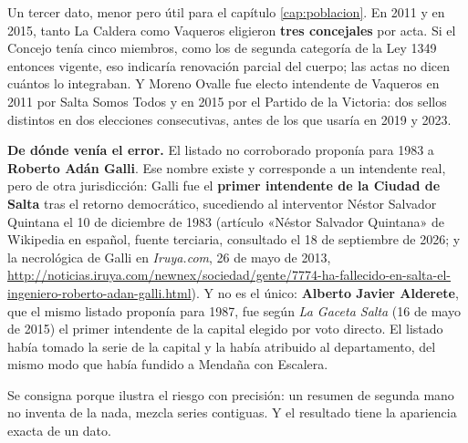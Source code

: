 Un tercer dato, menor pero útil para el capítulo \ref{cap:poblacion}. En 2011 y en 2015, tanto La Caldera como Vaqueros eligieron \textbf{tres concejales} por acta. Si el Concejo tenía cinco miembros, como los de segunda categoría de la Ley 1349 entonces vigente, eso indicaría renovación parcial del cuerpo; las actas no dicen cuántos lo integraban. Y Moreno Ovalle fue electo intendente de Vaqueros en 2011 por Salta Somos Todos y en 2015 por el Partido de la Victoria: dos sellos distintos en dos elecciones consecutivas, antes de los que usaría en 2019 y 2023.

\textbf{De dónde venía el error.} El listado no corroborado proponía para 1983 a \textbf{Roberto Adán Galli}. Ese nombre existe y corresponde a un intendente real, pero de otra jurisdicción: Galli fue el \textbf{primer intendente de la Ciudad de Salta} tras el retorno democrático, sucediendo al interventor Néstor Salvador Quintana el 10 de diciembre de 1983 (artículo «Néstor Salvador Quintana» de Wikipedia en español, fuente terciaria, consultado el 18 de septiembre de 2026; y la necrológica de Galli en \textit{Iruya.com}, 26 de mayo de 2013, \url{http://noticias.iruya.com/newnex/sociedad/gente/7774-ha-fallecido-en-salta-el-ingeniero-roberto-adan-galli.html}). Y no es el único: \textbf{Alberto Javier Alderete}, que el mismo listado proponía para 1987, fue según \textit{La Gaceta Salta} (16 de mayo de 2015) el primer intendente de la capital elegido por voto directo. El listado había tomado la serie de la capital y la había atribuido al departamento, del mismo modo que había fundido a Mendaña con Escalera.

Se consigna porque ilustra el riesgo con precisión: un resumen de segunda mano no inventa de la nada, mezcla series contiguas. Y el resultado tiene la apariencia exacta de un dato.

